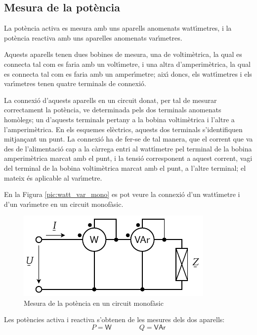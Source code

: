 \subsection{Mesura de la pot\`{e}ncia}

La pot\`{e}ncia activa es mesura amb uns aparells anomenats watt\'{\i}metres,
i la pot\`{e}ncia reactiva amb uns aparelles anomenats var\'{\i}metres.

Aquests aparells tenen dues bobines de mesura, una de voltim\`{e}trica,
la qual es connecta tal com es faria amb un volt\'{\i}metre, i una altra
d'amperim\`{e}trica, la qual es connecta tal com es faria amb un
amper\'{\i}metre; aix\'{\i} doncs, els watt\'{\i}metres i els var\'{\i}metres tenen
quatre terminals de connexi\'{o}.

La connexi\'{o} d'aquests aparells en un circuit donat, per tal de
mesurar correctament la pot\`{e}ncia, ve determinada pels dos terminals
anomenats hom\`{o}legs; un d'aquests terminals pertany a la bobina
voltim\`{e}trica i l'altre a l'amperim\`{e}trica. En els esquemes el\`{e}ctrics,
aquests dos terminals s'identifiquen mitjan\c{c}ant un punt. La connexi\'{o}
ha de fer-se de tal manera, que el corrent que va des de
l'alimentaci\'{o} cap a la c\`{a}rrega entri al watt\'{\i}metre pel terminal de
la bobina amperim\`{e}trica marcat amb el punt, i la tensi\'{o} corresponent
a aquest corrent, vagi del terminal de la bobina voltim\`{e}trica marcat
amb el punt, a l'altre terminal; el mateix \'{e}s aplicable al
var\'{\i}metre.

En la Figura \vref{pic:watt_var_mono} es pot veure la connexi\'{o} d'un
watt\'{\i}metre i d'un var\'{\i}metre en un circuit monof\`{a}sic.


\begin{figure}[h]
\centering
    \includegraphics{Imatges/Cap-Fonaments-Mesura-Potencia-Monof.pdf}
\caption{Mesura de la pot\`{e}ncia en un circuit  monof\`{a}sic}
\label{pic:watt_var_mono}
\end{figure}

Les pot\`{e}ncies activa i reactiva s'obtenen de les mesures dels dos
aparells:
\begin{equation}
    P = \textsf{W} \qquad\qquad Q = \textsf{VAr}
\end{equation}

